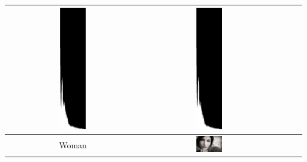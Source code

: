 \documentclass[12pt,a4paper]{article}
\begin{document}
\begin{center}
\begin{longtable}{|c|c|c|c|c|}
       \includegraphics[width=0.2\textwidth]{./latexSource/tiger_G_HIS.png} & 
       \includegraphics[width=0.2\textwidth]{./latexSource/tiger_R_HIS.png} \\
\hline
Woman & \includegraphics[width=0.2\textwidth]{./latexSource/woman_origin.png} & 

\end{longtable}
\end{center}
\end{document}

